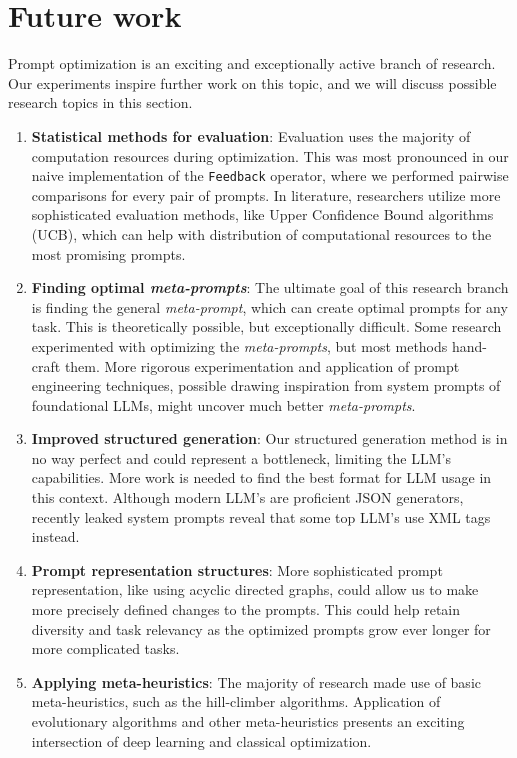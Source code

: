 \section{Future work}
Prompt optimization is an exciting and exceptionally active branch of research. 
Our experiments inspire further work on this topic, and we will discuss possible research topics in this section.
\begin{enumerate}
    \item \textbf{Statistical methods for evaluation}: Evaluation uses the majority of computation resources during optimization. This was most pronounced in our naive implementation of the \texttt{Feedback} operator, where we performed pairwise comparisons for every pair of prompts. In literature\cite{pryzant2023automaticpromptoptimizationgradient}\cite{zhang2024sprigimprovinglargelanguage}, researchers utilize more sophisticated evaluation methods, like Upper Confidence Bound algorithms (UCB), which can help with distribution of computational resources to the most promising prompts.
    \item \textbf{Finding optimal \textit{meta-prompts}}: The ultimate goal of this research branch is finding the general \textit{meta-prompt}, which can create optimal prompts for any task. This is theoretically possible\cite{dewynter2024metaprompting}, but exceptionally difficult. Some research\cite{fernando2023promptbreederselfreferentialselfimprovementprompt} experimented with optimizing the \textit{meta-prompts}, but most methods hand-craft them. More rigorous experimentation and application of prompt engineering techniques, possible drawing inspiration from system prompts of foundational LLMs, might uncover much better \textit{meta-prompts}.
    \item \textbf{Improved structured generation}: Our structured generation method is in no way perfect and could represent a bottleneck, limiting the LLM's capabilities. More work is needed to find the best format for LLM usage in this context. Although modern LLM's are proficient JSON generators, recently leaked system prompts reveal that some top LLM's use XML tags instead. 
    \item \textbf{Prompt representation structures}: More sophisticated prompt representation, like using acyclic directed graphs\cite{zhang2024sprigimprovinglargelanguage}, could allow us to make more precisely defined changes to the prompts. This could help retain diversity and task relevancy as the optimized prompts grow ever longer for more complicated tasks.
    \item \textbf{Applying meta-heuristics}: The majority of research made use of basic meta-heuristics, such as the hill-climber algorithms. Application of evolutionary algorithms\cite{guo2024connectinglargelanguagemodels} and other meta-heuristics\cite{pan2024plumpromptlearningusing} presents an exciting intersection of deep learning and classical optimization.

\end{enumerate}
